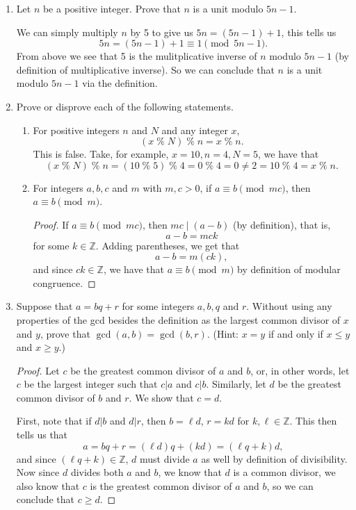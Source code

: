 \documentclass[11pt]{article}
\newcommand{\Z}{\mathbb{Z}}
\newcommand{\n}{\vspace{0.5cm}}
\newcommand{\mmod}{\;\%\;}
\begin{document}
\begin{enumerate}
    \item Let \(n\) be a positive integer. Prove that \(n\) is a unit modulo \(5n-1\).

      We can simply multiply \(n\) by 5 to give us \(5n = (5n-1) + 1\), this tells us
      \[5n = (5n-1) + 1 \equiv 1 \pmod{5n-1}.\]
      From above we see that 5 is the mulitplicative inverse of \(n\) modulo \(5n-1\) (by definition of multiplicative inverse).  So we can conclude that \(n\) is a unit modulo \(5n-1\) via the definition.
      \newpage

    \item Prove or disprove each of the following statements.
      \begin{enumerate}[label=(\alph*)]
        \item For positive integers \(n\) and \(N\) and any integer \(x\), \[(x \mmod N) \mmod n = x \mmod n.\]
          This is false.  Take, for example, \(x = 10, n = 4, N = 5\), we have that \[(x \mmod N) \mmod n = (10 \mmod 5) \mmod 4 = 0 \mmod 4 = 0 \neq 2 = 10 \mmod 4 = x \mmod n.\]

        \item For integers \(a,b,c\) and \(m\) with \(m,c > 0\), if \(a \equiv b \pmod{mc}\), then \(a \equiv b \pmod m\).
          \begin{proof}
            If \(a \equiv b \pmod{mc}\), then \(mc \mid (a-b)\) (by definition), that is, \[a-b = mck\] for some \(k \in \Z\).  Adding parentheses, we get that \[a-b = m (ck),\] and since \(ck \in \Z\), we have that \(a \equiv b \pmod m\) by definition of modular congruence.
          \end{proof} \n
      \end{enumerate}
    
    \item Suppose that \(a = bq + r\) for some integers \(a,b,q\) and \(r\).  Without using any properties of the gcd besides the definition as the largest common divisor of \(x\) and \(y\), prove that \(\gcd(a,b) = \gcd(b,r)\).  (Hint: \(x=y\) if and only if \(x \leq y\) and \(x \geq y\).)
      \begin{proof}
        Let \(c\) be the greatest common divisor of \(a\) and \(b\), or, in other words, let \(c\) be the largest integer such that \(c|a\) and \(c|b\).  Similarly, let \(d\) be the greatest common divisor of \(b\) and \(r\).  We show that \(c=d\).

        First, note that if \(d|b\) and \(d|r\), then \(b = \ell d\), \(r = kd\) for \(k,\ell \in \Z\).  This then tells us that 
        \[a = bq + r = (\ell d)q + (kd) = (\ell q + k)d,\]
        and since \((\ell q+k) \in \Z\), \(d\) must divide \(a\) as well by definition of divisibility.  Now since \(d\) divides both \(a\) and \(b\), we know that \(d\) is a common divisor, we also know that \(c\) is the greatest common divisor of \(a\) and \(b\), so we can conclude that \(c \geq d\).


\end{proof}
\end{enumerate}
\end{document}
